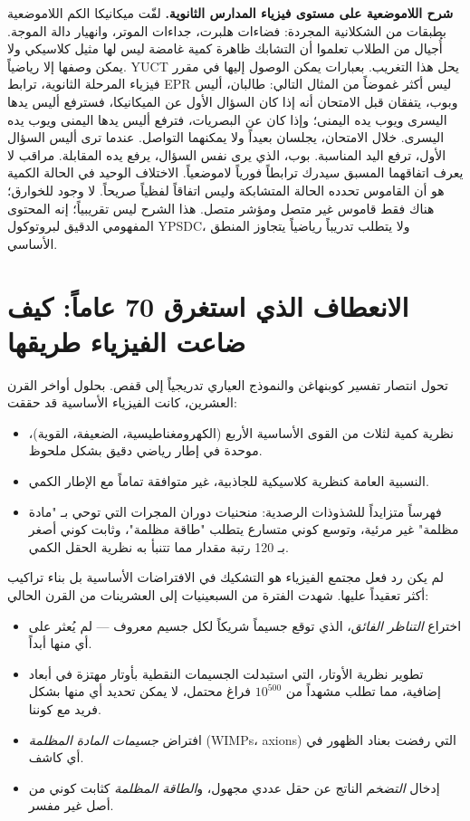 \documentclass[12pt,a4paper]{article}
\begin{document}
	\textbf{شرح اللاموضعية على مستوى فيزياء المدارس الثانوية.} لفّت ميكانيكا الكم اللاموضعية بطبقات من الشكلانية المجردة: فضاءات هلبرت، جداءات الموتر، وانهيار دالة الموجة. أُجيال من الطلاب تعلموا أن التشابك ظاهرة كمية غامضة ليس لها مثيل كلاسيكي ولا يمكن وصفها إلا رياضياً. YUCT يحل هذا التغريب. بعبارات يمكن الوصول إليها في مقرر فيزياء المرحلة الثانوية، ترابط EPR ليس أكثر غموضاً من المثال التالي: طالبان، أليس وبوب، يتفقان قبل الامتحان أنه إذا كان السؤال الأول عن الميكانيكا، فسترفع أليس يدها اليسرى ويوب يده اليمنى؛ وإذا كان عن البصريات، فترفع أليس يدها اليمنى ويوب يده اليسرى. خلال الامتحان، يجلسان بعيداً ولا يمكنهما التواصل. عندما ترى أليس السؤال الأول، ترفع اليد المناسبة. بوب، الذي يرى نفس السؤال، يرفع يده المقابلة. مراقب لا يعرف اتفاقهما المسبق سيدرك ترابطاً فورياً لاموضعياً. الاختلاف الوحيد في الحالة الكمية هو أن القاموس تحدده الحالة المتشابكة وليس اتفاقاً لفظياً صريحاً. لا وجود للخوارق؛ هناك فقط قاموس غير متصل ومؤشر متصل. هذا الشرح ليس تقريبياً؛ إنه المحتوى المفهومي الدقيق لبروتوكول YPSDC، ولا يتطلب تدريباً رياضياً يتجاوز المنطق الأساسي.
	
	\section{الانعطاف الذي استغرق 70 عاماً: كيف ضاعت الفيزياء طريقها}
	
	تحول انتصار تفسير كوبنهاغن والنموذج العياري تدريجياً إلى قفص. بحلول أواخر القرن العشرين، كانت الفيزياء الأساسية قد حققت:
	\begin{itemize}
		\item نظرية كمية لثلاث من القوى الأساسية الأربع (الكهرومغناطيسية، الضعيفة، القوية)، موحدة في إطار رياضي دقيق بشكل ملحوظ.
		\item النسبية العامة كنظرية كلاسيكية للجاذبية، غير متوافقة تماماً مع الإطار الكمي.
		\item فهرساً متزايداً للشذوذات الرصدية: منحنيات دوران المجرات التي توحي بـ "مادة مظلمة" غير مرئية، وتوسع كوني متسارع يتطلب "طاقة مظلمة"، وثابت كوني أصغر بـ 120 رتبة مقدار مما تتنبأ به نظرية الحقل الكمي.
	\end{itemize}
	
	لم يكن رد فعل مجتمع الفيزياء هو التشكيك في الافتراضات الأساسية بل بناء تراكيب أكثر تعقيداً عليها. شهدت الفترة من السبعينيات إلى العشرينات من القرن الحالي:
	\begin{itemize}
		\item اختراع \emph{التناظر الفائق}، الذي توقع جسيماً شريكاً لكل جسيم معروف — لم يُعثر على أي منها أبداً.
		\item تطوير نظرية الأوتار، التي استبدلت الجسيمات النقطية بأوتار مهتزة في أبعاد إضافية، مما تطلب مشهداً من \(10^{500}\) فراغ محتمل، لا يمكن تحديد أي منها بشكل فريد مع كوننا.
		\item افتراض \emph{جسيمات المادة المظلمة} (WIMPs، axions) التي رفضت بعناد الظهور في أي كاشف.
		\item إدخال \emph{التضخم} الناتج عن حقل عددي مجهول، و\emph{الطاقة المظلمة} كثابت كوني من أصل غير مفسر.
	\end{itemize}
	
\end{document}

